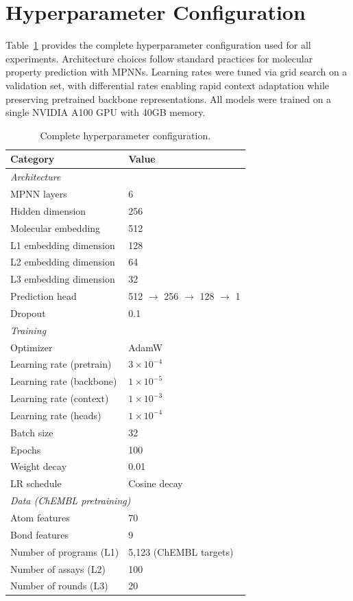 \documentclass[runningheads]{llncs}
\begin{document}
\section{Hyperparameter Configuration}
\label{app:hyperparams}

Table~\ref{tab:hyperparams} provides the complete hyperparameter configuration used for all experiments. Architecture choices follow standard practices for molecular property prediction with MPNNs. Learning rates were tuned via grid search on a validation set, with differential rates enabling rapid context adaptation while preserving pretrained backbone representations. All models were trained on a single NVIDIA A100 GPU with 40GB memory.

\begin{table}[H]
\caption{Complete hyperparameter configuration.}
\label{tab:hyperparams}
\centering
\small
\begin{tabular}{@{}ll@{}}
\toprule
\textbf{Category} & \textbf{Value} \\
\midrule
\multicolumn{2}{l}{\textit{Architecture}} \\
\quad MPNN layers & 6 \\
\quad Hidden dimension & 256 \\
\quad Molecular embedding & 512 \\
\quad L1 embedding dimension & 128 \\
\quad L2 embedding dimension & 64 \\
\quad L3 embedding dimension & 32 \\
\quad Prediction head & 512 $\rightarrow$ 256 $\rightarrow$ 128 $\rightarrow$ 1 \\
\quad Dropout & 0.1 \\
\midrule
\multicolumn{2}{l}{\textit{Training}} \\
\quad Optimizer & AdamW \\
\quad Learning rate (pretrain) & $3 \times 10^{-4}$ \\
\quad Learning rate (backbone) & $1 \times 10^{-5}$ \\
\quad Learning rate (context) & $1 \times 10^{-3}$ \\
\quad Learning rate (heads) & $1 \times 10^{-4}$ \\
\quad Batch size & 32 \\
\quad Epochs & 100 \\
\quad Weight decay & 0.01 \\
\quad LR schedule & Cosine decay \\
\midrule
\multicolumn{2}{l}{\textit{Data (ChEMBL pretraining)}} \\
\quad Atom features & 70 \\
\quad Bond features & 9 \\
\quad Number of programs (L1) & 5,123 (ChEMBL targets) \\
\quad Number of assays (L2) & 100 \\
\quad Number of rounds (L3) & 20 \\
\bottomrule
\end{tabular}
\end{table}
\end{document}
